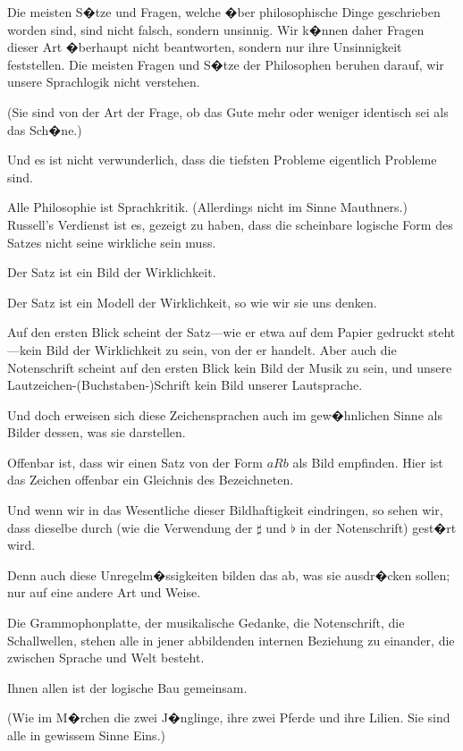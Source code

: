{Die meisten S�tze und Fragen, welche �ber
philosophische Dinge geschrieben worden sind, sind
nicht falsch, sondern unsinnig. Wir k�nnen daher
Fragen dieser Art �berhaupt nicht beantworten,
sondern nur ihre Unsinnigkeit feststellen. Die
meisten Fragen und S�tze der Philosophen beruhen
darauf,  wir unsere Sprachlogik nicht verstehen.

(Sie sind von der Art der Frage, ob das Gute
\enlargethispage{1pt} %
mehr oder weniger identisch sei als das Sch�ne.)

Und es ist nicht verwunderlich, dass die tiefsten
Probleme eigentlich  Probleme sind.}


{Alle Philosophie ist \glqq{}Sprachkritik\grqq{}. (Allerdings
nicht im Sinne Mauthners.) Russell's Verdienst ist
es, gezeigt zu haben, dass die scheinbare logische
Form des Satzes nicht seine wirkliche sein muss.}


{Der Satz ist ein Bild der Wirklichkeit.

Der Satz ist ein Modell der Wirklichkeit, so wie
wir sie uns denken.}


{Auf den ersten Blick scheint der Satz---wie er
etwa auf dem Papier gedruckt steht---kein Bild der
Wirklichkeit zu sein, von der er handelt. Aber
auch die Notenschrift scheint auf den ers\-ten Blick
kein Bild der Musik zu sein, und unsere Lautzeichen-\mbox{(Buchstaben-)}\AllowBreak{}Schrift
kein Bild unserer Lautsprache.

Und doch erweisen sich diese Zeichensprachen
auch im gew�hnlichen Sinne als Bilder dessen, was
sie darstellen.}


{Offenbar ist, dass wir einen Satz von der Form
\glqq{}$aRb$\grqq{} als Bild empfinden. Hier ist das Zeichen
offenbar ein Gleichnis des Bezeichneten.}


{Und wenn wir in das Wesentliche dieser Bildhaftigkeit
eindringen, so sehen wir, dass dieselbe
durch 
(wie die Verwendung der $\sharp$ und $\flat$ in der Notenschrift)
 gest�rt wird.

Denn auch diese Unregelm�ssigkeiten bilden
das ab, was sie ausdr�cken sollen; nur auf eine
andere Art und Weise.}


{Die Grammophonplatte, der musikalische Gedanke,
die Notenschrift, die Schallwellen, stehen
alle in jener abbildenden internen Beziehung zu
einander, die zwischen Sprache und Welt besteht.

Ihnen allen ist der logische Bau gemeinsam.

(Wie im M�rchen die zwei J�nglinge, ihre zwei
Pferde und ihre Lilien. Sie sind alle in gewissem
Sinne Eins.)}


